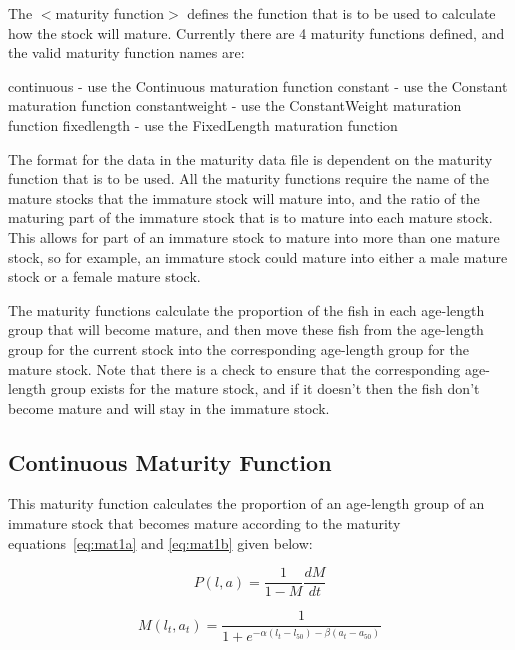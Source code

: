 \documentclass[10pt,twoside]{book}
\begin{document}
The $<$maturity function$>$ defines the function that is to be used to calculate how the stock will mature.  Currently there are 4 maturity functions defined, and the valid maturity function names are:

\bigskip
continuous - use the Continuous maturation function\newline
constant - use the Constant maturation function\newline
constantweight - use the ConstantWeight maturation function\newline
fixedlength - use the FixedLength maturation function

\bigskip
The format for the data in the maturity data file is dependent on the maturity function that is to be used.  All the maturity functions require the name of the mature stocks that the immature stock will mature into, and the ratio of the maturing part of the immature stock that is to mature into each mature stock.  This allows for part of an immature stock to mature into more than one mature stock, so for example, an immature stock could mature into either a male mature stock or a female mature stock.

\bigskip
The maturity functions calculate the proportion of the fish in each age-length group that will become mature, and then move these fish from the age-length group for the current stock into the corresponding age-length group for the mature stock.  Note that there is a check to ensure that the corresponding age-length group exists for the mature stock, and if it doesn't then the fish don't become mature and will stay in the immature stock.

\subsection{Continuous Maturity Function}
This maturity function calculates the proportion of an age-length group of an immature stock that becomes mature according to the maturity equations~\ref{eq:mat1a} and \ref{eq:mat1b} given below:

\begin{equation}\label{eq:mat1a}
P(l, a) = {\frac{1}{1 - M}}{\frac{dM}{dt}}
\end{equation}

\begin{equation}\label{eq:mat1b}
M(l_{t},a_{t}) = \frac{1}{1 + e^{-\alpha(l_{t} - l_{50}) - \beta(a_{t} - a_{50})}}
\end{equation}
\end{document}
